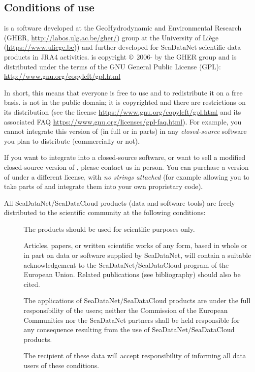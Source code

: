 \subsection*{Conditions of use}

\diva is a software developed at the GeoHydrodynamic and Environmental Research (GHER, \url{http://labos.ulg.ac.be/gher/}) group at the University of Liège (\url{https://www.uliege.be})) and further developed for SeaDataNet scientific data products in \textsf{JRA4} activities. \diva is copyright $\copyright$  2006-\the\year\xspace by the GHER group and is distributed under the terms of the GNU General Public License (GPL): \url{http://www.gnu.org/copyleft/gpl.html} 

In short, this means that everyone is free to use \diva and to redistribute it on a free basis. \diva is not in the public domain; it is copyrighted and there are restrictions on its distribution (see the license \url{https://www.gnu.org/copyleft/gpl.html} and its associated FAQ \url{https://www.gnu.org/licenses/gpl-faq.html}). For example, you cannot integrate this version of \diva (in full or in parts) in any \textit{closed-source} software you plan to distribute (commercially or not).

If you want to integrate \diva into a closed-source software, or want to sell a modified closed-source version of \diva, please contact us in person. You can purchase a version of \diva under a different license, with \textit{no strings attached} (for example allowing you to take parts of \diva and integrate them into your own proprietary code).

\vspace{.25cm}
All SeaDataNet/SeaDataCloud products (data and software tools) are freely distributed to the scientific community at the following conditions: 

\begin{description}
\item[\checkmark] The products should be used for scientific purposes only.
\item[\checkmark] Articles, papers, or written scientific works of any form, based in whole or in part on data or software supplied by SeaDataNet, will contain a suitable acknowledgement to the SeaDataNet/SeaDataCloud program of the European Union. Related publications (see bibliography) should also be cited.
\item[\checkmark] The applications of SeaDataNet/SeaDataCloud products are under the full responsibility of the users; neither the Commission of the European Communities nor the SeaDataNet partners shall be held responsible for any consequence resulting from the use of SeaDataNet/SeaDataCloud products. 
\item[\checkmark] The recipient of these data will accept responsibility of informing all data users of these conditions.
\end{description}

